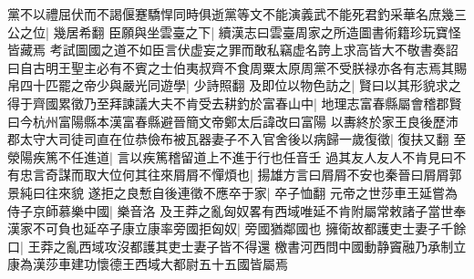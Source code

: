 黨不以禮屈伏而不謁偃蹇驕悍同時俱逝黨等文不能演義武不能死君釣采華名庶幾三公之位|{
	幾居希翻}
臣願與坐雲臺之下|{
	續漢志曰雲臺周家之所造圖書術籍珍玩寶怪皆藏焉}
考試圖國之道不如臣言伏虚妄之罪而敢私竊虚名誇上求高皆大不敬書奏詔曰自古明王聖主必有不賓之士伯夷叔齊不食周粟太原周黨不受朕禄亦各有志焉其賜帛四十匹罷之帝少與嚴光同遊學|{
	少詩照翻}
及即位以物色訪之|{
	賢曰以其形貌求之}
得于齊國累徵乃至拜諫議大夫不肯受去耕釣於富春山中|{
	地理志富春縣屬會稽郡賢曰今杭州富陽縣本漢富春縣避晉簡文帝鄭太后諱改曰富陽}
以夀終於家王良後歷沛郡太守大司徒司直在位恭儉布被瓦器妻子不入官舍後以病歸一歲復徵|{
	復扶又翻}
至滎陽疾篤不任進道|{
	言以疾篤稽留道上不進于行也任音壬}
過其友人友人不肯見曰不有忠言奇謀而取大位何其往來屑屑不憚煩也|{
	揚雄方言曰屑屑不安也秦晉曰屑屑郭景純曰往來貌}
遂拒之良慙自後連徵不應卒于家|{
	卒子恤翻}
元帝之世莎車王延嘗為侍子京師慕樂中國|{
	樂音洛}
及王莽之亂匈奴畧有西域唯延不肯附屬常敕諸子當世奉漢家不可負也延卒子康立康率旁國拒匈奴|{
	旁國猶鄰國也}
擁衛故都護吏士妻子千餘口|{
	王莽之亂西域攻沒都護其吏士妻子皆不得還}
檄書河西問中國動静竇融乃承制立康為漢莎車建功懷德王西域大都尉五十五國皆屬焉

